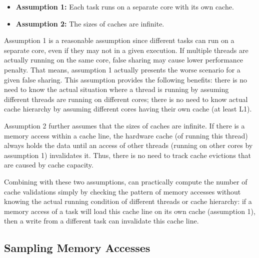 \begin{itemize} 
\item {\bf Assumption 1:} Each task runs on a separate core with its own cache. 

\item {\bf Assumption 2: } The sizes of caches are infinite. 
 
\end{itemize}

Assumption 1 is a reasonable assumption since different tasks can run on a separate core, even if they may not in a given execution.  If multiple threads are actually running on the same core, false sharing may cause lower performance penalty. That means, assumption 1 actually presents the worse scenario for a given false sharing. This assumption provides the following benefits: there is no need to know the actual situation where a thread is running by assuming different threads are running on different cores; there is no need to know actual cache hierarchy by assuming different cores having their own cache (at least L1). 

Assumption 2 further assumes that the sizes of caches are infinite. If there is a memory access within a cache line, the hardware cache (of running this thread) always holds the data until an access of other threads (running on other cores by assumption 1) invalidates it. Thus, there is no need to track cache evictions that are caused by cache capacity. 

Combining with these two assumptions, \cheetah{} can practically compute the number of cache validations simply by checking the pattern of memory accesses without knowing the actual running condition of different threads or cache hierarchy: if a memory access of a task will load this cache line on its own cache (assumption 1), then a write from a different task can invalidate this cache line. 

 


\subsection{Sampling Memory Accesses}
\label{sec:perfcounter}

